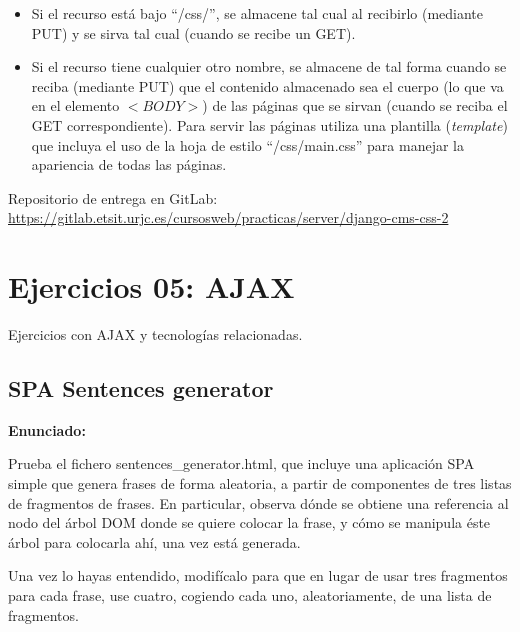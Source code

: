 \begin{itemize}
\item Si el recurso está bajo ``/css/'', se almacene tal cual al recibirlo (mediante PUT) y se sirva tal cual (cuando se recibe un GET).
\item Si el recurso tiene cualquier otro nombre, se almacene de tal forma cuando se reciba (mediante PUT) que el contenido almacenado sea el cuerpo (lo que va en el elemento $<BODY>$) de las páginas que se sirvan (cuando se reciba el GET correspondiente). Para servir las páginas utiliza una plantilla (\emph{template}) que incluya el uso de la hoja de estilo ``/css/main.css'' para manejar la apariencia de todas las páginas.
\end{itemize}

Repositorio de entrega en GitLab: \\
\url{https://gitlab.etsit.urjc.es/cursosweb/practicas/server/django-cms-css-2}

\section{Ejercicios 05: AJAX}

Ejercicios con AJAX y tecnologías relacionadas.

\subsection{SPA Sentences generator}
\label{subsec:spa-sentences-generator}

\textbf{Enunciado:}

Prueba el fichero sentences\_generator.html, que incluye una aplicación SPA simple que genera frases de forma aleatoria, a partir de componentes de tres listas de fragmentos de frases. En particular, observa dónde se obtiene una referencia al nodo del árbol DOM donde se quiere colocar la frase, y cómo se manipula éste árbol para colocarla ahí, una vez está generada.

Una vez lo hayas entendido, modifícalo para que en lugar de usar tres fragmentos para cada frase, use cuatro, cogiendo cada uno, aleatoriamente, de una lista de fragmentos.

